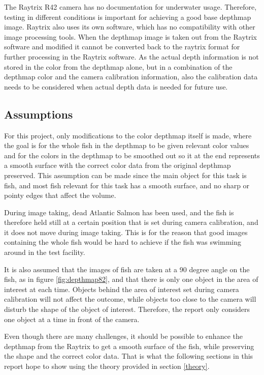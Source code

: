 The Raytrix R42 camera has no documentation for underwater usage. Therefore, testing in different conditions is important for achieving a good base depthmap image. Raytrix also uses its own software, which has no compatibility with other image processing tools. When the depthmap image is taken out from the Raytrix software and modified it cannot be converted back to the raytrix format for further processing in the Raytrix software. As the actual depth information is not stored in the color from the depthmap alone, but in a combination of the depthmap color and the camera calibration information, also the calibration data needs to be considered when actual depth data is needed for future use. 



\subsection{Assumptions}

For this project, only modifications to the color depthmap itself is made, where the goal is for the whole fish in the depthmap to be given relevant color values and for the colors in the depthmap to be smoothed out so it at the end represents a smooth surface with the correct color data from the original depthmap preserved. This assumption can be made since the main object for this task is fish, and most fish relevant for this task has a smooth surface, and no sharp or pointy edges that affect the volume. 

During image taking, dead Atlantic Salmon has been used, and the fish is therefore held still at a certain position that is set during camera calibration, and it does not move during image taking. This is for the reason that good images containing the whole fish would be hard to achieve if the fish was swimming around in the test facility.

It is also assumed that the images of fish are taken at a 90 degree angle on the fish, as in figure \ref{fig:depthmap82}, and that there is only one object in the area of interest at each time. Objects behind the area of interest set during camera calibration will not affect the outcome, while objects too close to the camera will disturb the shape of the object of interest. Therefore, the report only considers one object at a time in front of the camera.
\newline

Even though there are many challenges, it should be possible to enhance the depthmap from the Raytrix to get a smooth surface of the fish, while preserving the shape and the correct color data. That is what the following sections in this report hope to show using the theory provided in section \ref{theory}.